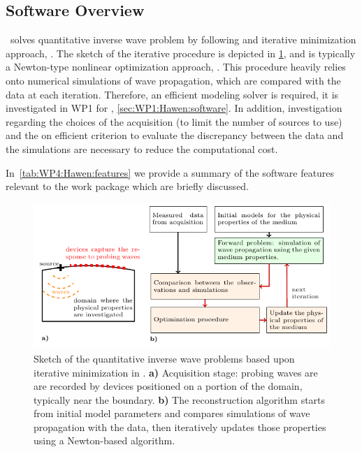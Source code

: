 \subsection{Software Overview}
\label{sec:WP4:Hawen:summary}

\hawen~solves quantitative inverse wave problem by following 
and iterative minimization approach, \cite{Faucher2020adjoint,faucher_hawen_2021}.
The sketch of the iterative procedure is depicted 
in \cref{figure:hawen:wp4:inversion}, and is typically a 
Newton-type nonlinear optimization approach, \cite{Virieux2009}.
This procedure heavily relies onto numerical simulations of 
wave propagation, which are compared with the data at each 
iteration. Therefore, an efficient modeling solver is required,
it is investigated in WP1 for \hawen, \cref{sec:WP1:Hawen:software}.
In addition, investigation regarding the choices of the acquisition
(to limit the number of sources to use) and the on efficient criterion
to evaluate the discrepancy between the data and the simulations 
are necessary to reduce the computational cost.

In~\cref{tab:WP4:Hawen:features} we provide a summary of the software features relevant to the work package which are briefly discussed.

\begin{figure}[ht!]\centering
\includegraphics[scale=1.00]{graphics/hawen/haven_inversion}
\caption{Sketch of the quantitative inverse wave problems based upon 
         iterative minimization in \hawen. %
         \textbf{a)} Acquisition stage: probing waves are are 
                     recorded by devices positioned on a portion 
                     of the domain, typically near the boundary.
         \textbf{b)} The reconstruction algorithm starts from initial 
                     model parameters and compares simulations of wave
                     propagation with the data, 
                     then iteratively updates those properties using
                     a Newton-based algorithm.}
\label{figure:hawen:wp4:inversion}
\end{figure}


